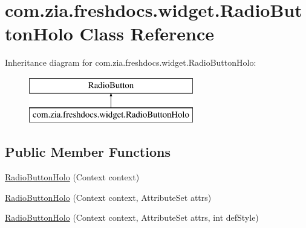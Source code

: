 \hypertarget{classcom_1_1zia_1_1freshdocs_1_1widget_1_1_radio_button_holo}{\section{com.\-zia.\-freshdocs.\-widget.\-Radio\-Button\-Holo Class Reference}
\label{classcom_1_1zia_1_1freshdocs_1_1widget_1_1_radio_button_holo}
}
Inheritance diagram for com.\-zia.\-freshdocs.\-widget.\-Radio\-Button\-Holo\-:\begin{figure}[H]
\begin{center}
\leavevmode
\includegraphics[height=2.000000cm]{classcom_1_1zia_1_1freshdocs_1_1widget_1_1_radio_button_holo}
\end{center}
\end{figure}
\subsection*{Public Member Functions}
\begin{DoxyCompactItemize}
\item 
\hyperlink{classcom_1_1zia_1_1freshdocs_1_1widget_1_1_radio_button_holo_a59a57a0bae16c25f6a39935a5fe93a14}{Radio\-Button\-Holo} (Context context)
\item 
\hyperlink{classcom_1_1zia_1_1freshdocs_1_1widget_1_1_radio_button_holo_a3d2b21d12cede70f5578c11001aec4c8}{Radio\-Button\-Holo} (Context context, Attribute\-Set attrs)
\item 
\hyperlink{classcom_1_1zia_1_1freshdocs_1_1widget_1_1_radio_button_holo_ab07d7bee28f73b962670e3ece98d74ce}{Radio\-Button\-Holo} (Context context, Attribute\-Set attrs, int def\-Style)
\end{DoxyCompactItemize}


